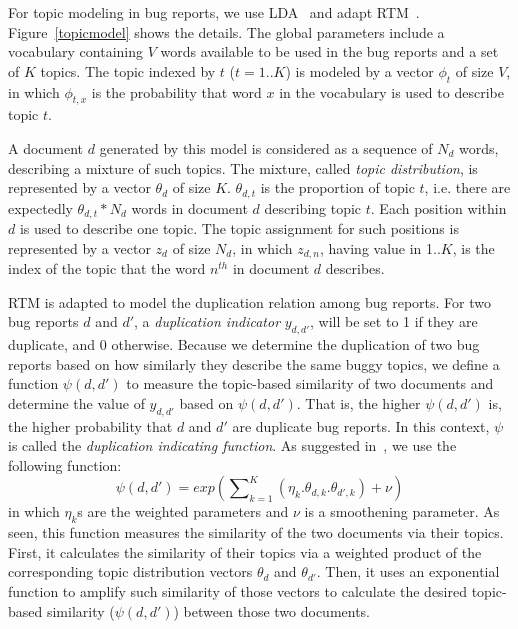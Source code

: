 For topic modeling in bug reports, we use LDA~\cite{lda} and adapt
RTM~\cite{RTM}. Figure~\ref{topicmodel} shows the details.  The global
parameters include a vocabulary containing $V$ words available to be
used in the bug reports and a set of $K$ topics. The topic indexed by
$t$ ($t=1..K$) is modeled by a vector $\phi_t$ of size $V$, in which
$\phi_{t,x}$ is the probability that word $x$ in the vocabulary is
used to describe topic $t$.

A document $d$ generated by this model is considered as a sequence of
$N_d$ words, describing a mixture of such topics. The mixture, called
{\em topic distribution}, is represented by a vector $\theta_d$ of
size $K$. $\theta_{d,t}$ is the proportion of topic $t$, i.e. there
are expectedly $\theta_{d,t}*N_d$ words in document $d$ describing
topic $t$. Each position within $d$ is used to describe one topic. The
topic assignment for such positions is represented by a vector $z_d$
of size $N_d$, in which $z_{d,n}$, having value in 1..$K$, is the
index of the topic that the word $n^{th}$ in document $d$ describes.

\vspace{0.04in}
RTM is adapted to model the duplication relation among bug
reports. For two bug reports $d$ and $d'$, a {\em duplication
indicator} $y_{d,d'}$, will be set to 1 if they are duplicate, and 0
otherwise. Because we determine the duplication of two bug reports
based on how similarly they describe the same buggy topics, we define
a function $\psi(d,d')$ to measure the topic-based similarity of two
documents and determine the value of $y_{d,d'}$ based on
$\psi(d,d')$. That is, the higher $\psi(d,d')$ is, the higher
probability that $d$ and $d'$ are duplicate bug reports. In this
context, $\psi$ is called the {\em duplication indicating
function}. As suggested in~\cite{RTM}, we use the following function:
$$\psi(d, d') = exp({\sum\nolimits_{k=1}^K(\eta_k.\theta_{d,k}.\theta_{d',k})+
\nu})$$ in which $\eta_k$s are the weighted parameters and $\nu$ is a
smoothening parameter. As seen, this function measures the similarity of
the two documents via their topics. First, it calculates the
similarity of their topics via a weighted product of the corresponding
topic distribution vectors $\theta_d$ and $\theta_{d'}$. Then, it uses
an exponential function to amplify such similarity of those
vectors to calculate the desired topic-based similarity ($\psi(d,d')$)
between those two documents.

